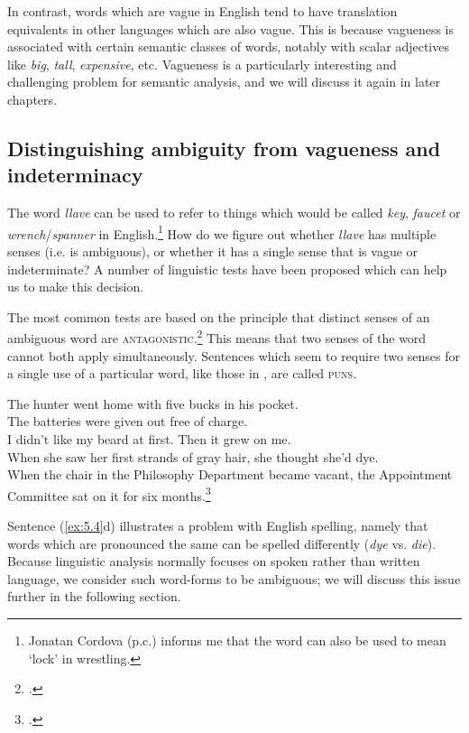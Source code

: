 In contrast, words which are vague in English tend to have translation equivalents in other languages which are also vague. This is because vagueness is associated with certain semantic classes of words, notably with scalar adjectives like \textit{big}, \textit{tall}, \textit{expensive}, etc. Vagueness is a particularly interesting and challenging problem for semantic analysis, and we will discuss it again in later chapters.


\subsection{Distinguishing ambiguity from vagueness and indeterminacy}\label{sec:5.3.2}

The  word \textit{llave} can be used to refer to things which would be called \textit{key}, \textit{faucet} or \textit{wrench}/\textit{spanner} in English.\footnote{Jonatan Cordova (p.c.) informs me that the word can also be used to mean ‘lock’ in wrestling.} How do we figure out whether \textit{llave} has multiple senses (i.e. is ambiguous), or whether it has a single sense that is vague or indeterminate? A number of linguistic tests have been proposed which can help us to make this decision. 



The most common tests are based on the principle that distinct senses of an ambiguous word are \textsc{antagonistic}.\footnote{\citet[61]{Cruse1986}.} This means that two senses of the word cannot both apply simultaneously. Sentences which seem to require two senses for a single use of a particular word, like those in , are called \textsc{puns}.

\largerpage
\ea \label{ex:5.4}
\ea The hunter went home with five bucks in his pocket.\\
\ex The batteries were given out free of charge.\\
\ex I didn’t like my beard at first. Then it grew on me.\\
\ex When she saw her first strands of gray hair, she thought she’d dye.\\
\ex When the chair in the Philosophy Department became vacant, 
  the Appointment Committee sat on it for six months.\footnote{\citet[108]{Cruse2000}.}
                       \z
\z

Sentence (\ref{ex:5.4}d) illustrates a problem with English spelling, namely that words which are pronounced the same can be spelled differently (\textit{dye} vs. \textit{die}). Because linguistic analysis normally focuses on spoken rather than written language, we consider such word-forms to be ambiguous; we will discuss this issue further in the following section.


